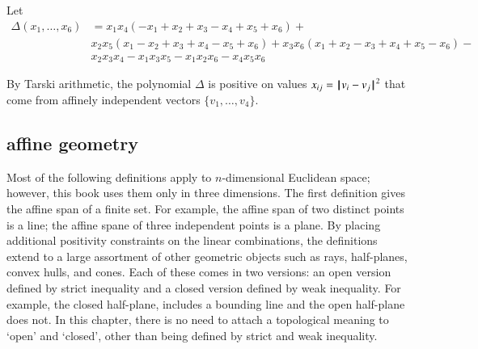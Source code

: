 \begin{definition}[$\Delta$]\label{def:delta}  Let 
$$
\begin{array}{lll}
\Delta(x_1,\ldots,x_6) &= x_1 x_4 (- x_1+x_2+x_3- x_4+x_5+x_6)+\\&
            x_2 x_5 (x_1- x_2+x_3+x_4- x_5+x_6)
            +x_3 x_6 (x_1+x_2- x_3+x_4+x_5- x_6)
            - \\&x_2 x_3 x_4- x_1 x_3 x_5- x_1 x_2 x_6- x_4 x_5 x_6
\end{array}
$$
\end{definition}

By Tarski arithmetic, %
the polynomial $\Delta$ is positive on values $x_{ij}={\hskip0.1em|\hskip-0.15em|\hskip0.1em}v_i - v_j{\hskip0.1em|\hskip-0.15em|\hskip0.1em}^2$
that come from affinely independent vectors $\{v_1,\ldots,v_4\}$.





\subsection{affine geometry}



Most of the following definitions apply to $n$-dimensional
Euclidean space; however, this book uses them only in
three dimensions.  The first definition 
gives the affine span of a finite set.  For example,
the affine span of two distinct points is a line;
the affine spane of three independent points is a plane.
By placing additional
positivity constraints on the linear combinations, the definitions
extend to a large assortment of other geometric objects
such as rays, half-planes, convex hulls, and cones.  
Each of these comes in two versions: an open version
defined by strict inequality and a closed version defined
by weak inequality.  For example, the closed half-plane,
includes a bounding line and the open half-plane does
not.  In this chapter, there is no need
to attach a topological meaning to `open' and `closed',
other than being defined by strict and weak inequality.


